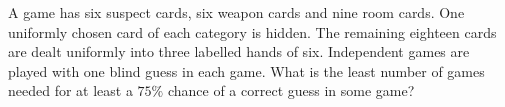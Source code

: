 A game has six suspect cards, six weapon cards and nine room cards. One uniformly chosen card of each category is hidden. The remaining eighteen cards are dealt uniformly into three labelled hands of six. Independent games are played with one blind guess in each game. What is the least number of games needed for at least a $ 75\%$ chance of a correct guess in some game?
